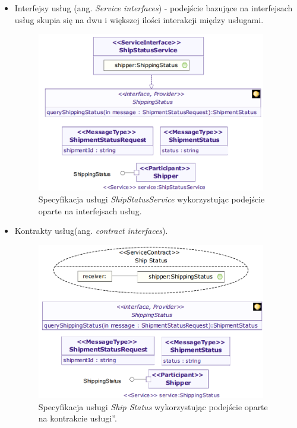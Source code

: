 \begin{itemize}
\item{Interfejsy usług (ang. \emph{Service interfaces}) - podejście bazujące na interfejsach usług skupia się na dwu i większej ilości interakcji między usługami. 
\begin{figure}[h!tbp]
\begin{centering}
\includegraphics[width=10cm]{img/service_interface_based_approach.png}
\caption[Specyfikacja usługi \emph{ShipStatusService} wykorzystując podejście oparte na interfejsach usług.]{Specyfikacja usługi \emph{ShipStatusService} wykorzystując podejście oparte na interfejsach usług.\cite{SoaMLErvBase}}\label{service_interface_based_approach}
\end{centering}
\end{figure}} 

\item{Kontrakty usług(ang. \emph{contract interfaces}).
\begin{figure}[h!tbp]
\begin{centering}
\includegraphics[width=10cm]{img/service_contract_based_approach.png}
\caption[Specyfikacja usługi \emph{Ship Status} wykorzystując podejście oparte na \quotedblbase kontrakcie usługi\textquotedblright. ]{Specyfikacja usługi \emph{Ship Status} wykorzystując podejście oparte na \quotedblbase kontrakcie usługi\textquotedblright.\cite{SoaMLErvBase}}\label{service_contract_based_approach}
\end{centering}
\end{figure}
}
\end{itemize}


